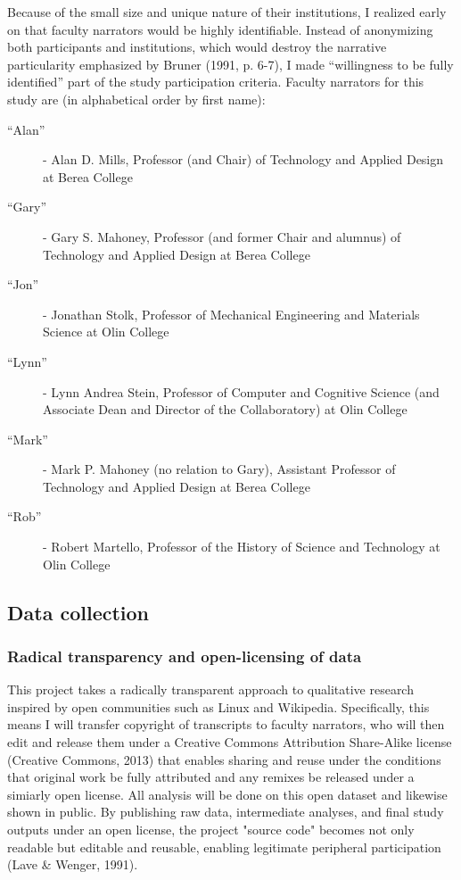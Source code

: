 Because of the small size and unique nature of their institutions, I realized early on that faculty narrators would be highly identifiable. Instead of anonymizing both participants and institutions, which would destroy the narrative particularity emphasized by Bruner (1991, p. 6-7), I made “willingness to be fully identified” part of the study participation criteria. Faculty narrators for this study are (in alphabetical order by first name):

\begin{description}
\item[“Alan”] - Alan D. Mills, Professor (and Chair) of Technology and Applied Design at Berea College
\item[“Gary”] - Gary S. Mahoney, Professor (and former Chair and alumnus) of Technology and Applied Design at Berea College
\item[“Jon”] - Jonathan Stolk, Professor of Mechanical Engineering and Materials Science at Olin College
\item[“Lynn”] - Lynn Andrea Stein, Professor of Computer and Cognitive Science (and Associate Dean and Director of the Collaboratory) at Olin College
\item[“Mark”] - Mark P. Mahoney (no relation to Gary), Assistant Professor of Technology and Applied Design at Berea College
\item[“Rob”] - Robert Martello, Professor of the History of Science and Technology at Olin College
\end{description}

\subsection{Data collection}

\subsubsection{Radical transparency and open-licensing of data}

This project takes a radically transparent approach to qualitative research inspired by open communities such as Linux and Wikipedia. Specifically, this means I will transfer copyright of transcripts to faculty narrators, who will then edit and release them under a Creative Commons Attribution Share-Alike license (Creative Commons, 2013) that enables sharing and reuse under the conditions that original work be fully attributed and any remixes be released under a simiarly open license. All analysis will be done on this open dataset and likewise shown in public. By publishing raw data, intermediate analyses, and final study outputs under an open license, the project "source code" becomes not only readable but editable and reusable, enabling legitimate peripheral participation (Lave & Wenger, 1991).

